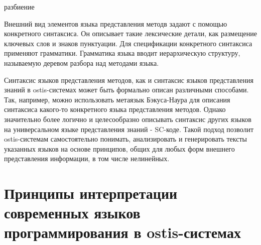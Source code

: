 \begin{SCn}
\begin{scnrelfromset}{разбиение}
    \begin{scnindent}
    \end{scnindent}
    \begin{scnindent}
    \end{scnindent}
\end{scnrelfromset}
\end{SCn}

Внешний вид элементов языка представления методв задают с помощью конкретного синтаксиса. Он описывает такие лексические
детали, как размещение ключевых слов и знаков пунктуации. Для спецификации конкретного синтаксиса применяют грамматики.
Грамматика языка вводит иерархическую структуру, называемую деревом разбора над методами языка.

Синтаксис языков представления методов, как и синтаксис языков представления знаний в ostis-системах может быть
формально описан различными способами. Так, например, можно использовать метаязык Бэкуса-Наура для описания синтаксиса
какого-то конкретного языка представления методов. Однако значительно более логично и целесообразно описывать синтаксис
других языков на универсальном языке представления знаний - SC-коде. Такой подход позволит ostis-системам самостоятельно
понимать, анализировать и генерировать тексты указанных языков на основе принципов, общих для любых форм внешнего
представления информации, в том числе нелинейных.


\section{Принципы интерпретации современных языков программирования в ostis-системах}

%
